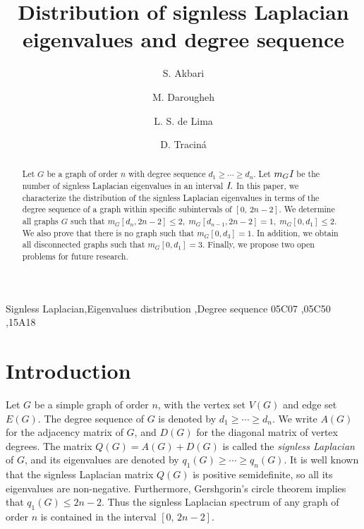 \documentclass[preprint,12pt]{elsarticle}
\begin{document}
\begin{frontmatter} 

\title{Distribution of signless Laplacian eigenvalues and
degree sequence}
\author[inst1]{S. Akbari}

\author[inst3]{M. Darougheh}

\author[inst2]{L. S. de Lima}

\author[inst2]{D. Traciná }





\address[inst1]{Department of Mathematical Sciences, Sharif University of Technology}
\address[inst2]{Programa de Pós-Graduação em Matemática, Universidade Federal do Paraná, Curitiba, Brazil}
\address[inst3]{Department of Mathematics and Computer Science, University of Science and Technology}

\begin{abstract}
Let $G$ be a graph of order $n$ with degree sequence $d_1 \geq \cdots \geq d_{n}$. Let $m_{G} \emph{I}$ be the number of signless Laplacian eigenvalues in an interval $\emph{I}.$ In this paper, we characterize the distribution of the signless Laplacian eigenvalues in terms of the degree sequence of a graph within specific subintervals of $[0, \, 2n-2].$ We determine all graphs $G$ such that $m_{G}[d_n, 2n-2] \leq 2, \; m_{G}[d_{n-1}, 2n-2] = 1, \; m_{G}[0, d_1] \le 2.$ We also prove that there is no graph such that $m_{G}[0, d_3]=1$. In addition, we obtain all disconnected graphs such that $m_{G}[0, d_1] = 3$. Finally, we propose two open problems for future research.
\end{abstract}


\begin{keyword}
Signless Laplacian\sep Eigenvalues distribution \sep Degree sequence
\MSC[2020] 05C07 \sep 05C50 \sep 15A18 %
\end{keyword}

\end{frontmatter}

\section{Introduction}
Let $G$ be a simple graph of order $n$, with the vertex set $V(G)$ and edge set $E(G)$. The degree sequence of $G$ is denoted by $d_1 \geq \cdots \geq d_n$. We write $A(G)$ for the adjacency matrix of $G$, and $D(G)$ for the diagonal matrix of vertex degrees. The matrix $Q(G) = A(G) + D(G)$ is called the \textit{signless Laplacian} of $G$, and its eigenvalues are denoted by $q_1(G) \geq \cdots \geq q_n(G)$. It is well known that the signless Laplacian matrix $Q(G)$ is positive semidefinite, so all its eigenvalues are non-negative. Furthermore, Gershgorin's circle theorem implies that $q_1(G) \le 2n-2$. Thus the signless Laplacian spectrum of any graph of order $n$ is contained in the interval $[0,\, 2n-2]$.
\end{document}
